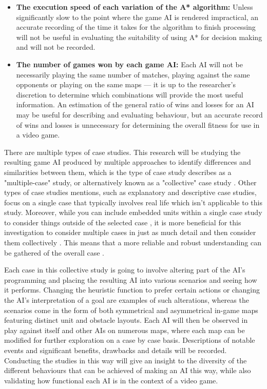 \documentclass[11pt, a4paper]{report}
\begin{document}
\begin{itemize}
\item \textbf{The execution speed of each variation of the A* algorithm:} Unless significantly slow to the point where the game AI is rendered impractical, an accurate recording of the time it takes for the algorithm to finish processing will not be useful in evaluating the suitability of using A* for decision making and will not be recorded.
\item \textbf{The number of games won by each game AI:} Each AI will not be necessarily playing the same number of matches, playing against the same opponents or playing on the same maps --- it is up to the researcher's discretion to determine which combinations will provide the most useful information. An estimation of the general ratio of wins and losses for an AI may be useful for describing and evaluating behaviour, but an accurate record of wins and losses is unnecessary for determining the overall fitness for use in a video game.
\end{itemize}

There are multiple types of case studies. This research will be studying the resulting game AI produced by multiple approaches to identify differences and similarities between them, which is the type of case study \citeauthor{yin2003k} \parencite*{yin2003k} describes as a "multiple-case" study, or alternatively known as a "collective" case study \parencite{stake1995art}. Other types of case studies \citeauthor{yin2003k} \parencite*{yin2003k} mentions, such as explanatory and descriptive case studies, focus on a single case that typically involves real life which isn't applicable to this study. Moreover, while you can include embedded units within a single case study to consider things outside of the selected case \parencite[550]{baxter2008qualitative}, it is more beneficial for this investigation to consider multiple cases in just as much detail and then consider them collectively \parencite[555]{baxter2008qualitative}. This means that a more reliable and robust understanding can be gathered of the overall case \parencite[550]{baxter2008qualitative}.

Each case in this collective study is going to involve altering part of the AI's programming and placing the resulting AI into various scenarios and seeing how it performs. Changing the heuristic function to prefer certain actions or changing the AI's interpretation of a goal are examples of such alterations, whereas the scenarios come in the form of both symmetrical and asymmetrical in-game maps featuring distinct unit and obstacle layouts. Each AI will then be observed in play against itself and other AIs on numerous maps, where each map can be modified for further exploration on a case by case basis. Descriptions of notable events and significant benefits, drawbacks and details will be recorded. Conducting the studies in this way will give an insight to the diversity of the different behaviours that can be achieved of making an AI this way, while also validating how functional each AI is in the context of a video game.
\end{document}
